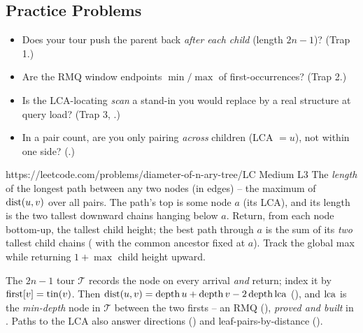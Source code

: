 \subsection{Practice Problems}

\begin{stuckbox}
\begin{itemize}[nosep, leftmargin=1.4em]
  \item Does your tour push the parent back \emph{after each child} (length $2n-1$)? (Trap 1.)
  \item Are the RMQ window endpoints $\min/\max$ of first-occurrences? (Trap 2.)
  \item Is the LCA-locating \emph{scan} a stand-in you would replace by a real structure at
        query load? (Trap 3, .)
  \item In a pair count, are you only pairing \emph{across} children (LCA $=u$), not within one
        side? (.)
\end{itemize}
\end{stuckbox}

\begin{practiceset}
    {https://leetcode.com/problems/diameter-of-n-ary-tree/}{LC Medium L3}
    {The \emph{length} of the longest path between any two nodes (in edges) -- the maximum of
    $\operatorname{dist}(u,v)$ over all pairs. The path's top is some node $a$ (its LCA), and its length is
    the two tallest downward chains hanging below $a$. Return, from each node bottom-up, the
    tallest child height; the best path through $a$ is the sum of its \emph{two} tallest child
    chains ( with the common ancestor fixed at $a$). Track the global max while
    returning $1+\max$ child height upward.}
\end{practiceset}

\begin{recallbox}
The $2n{-}1$ tour $\mathcal{T}$ records the node on every arrival \emph{and} return; index it by
$\mathrm{first}[v]=\operatorname{tin}(v)$. Then $\operatorname{dist}(u,v)=\operatorname{depth} u+\operatorname{depth} v-2\operatorname{depth}{\operatorname{lca}}$
(), and $\operatorname{lca}$ is the \emph{min-depth} node in $\mathcal{T}$ between the two
firsts -- an RMQ (), \emph{proved and built} in . Paths to
the LCA also answer directions () and leaf-pairs-by-distance
().
\end{recallbox}
